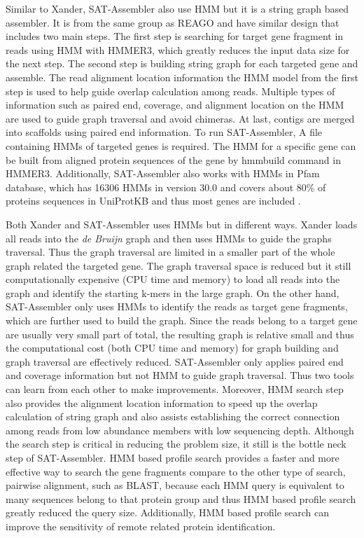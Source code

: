 \documentclass[]{msu-thesis}
\begin{document}
Similar to Xander, SAT-Assembler also use HMM but it is a string graph
based assembler. It is from the same group as REAGO and have similar
design that includes two main steps. The first step is searching for
target gene fragment in reads using HMM with HMMER3, which greatly
reduces the input data size for the next step. The second step is
building string graph for each targeted gene and assemble. The read
alignment location information the HMM model from the first step is
used to help guide overlap calculation among reads. Multiple types of
information such as paired end, coverage, and alignment location on
the HMM are used to guide graph traversal and avoid chimeras. At last,
contigs are merged into scaffolds using paired end information.  To
run SAT-Assembler, A file containing HMMs of targeted genes is
required. The HMM for a specific gene can be built from aligned
protein sequences of the gene by hmmbuild command in
HMMER3. Additionally, SAT-Assembler also works with HMMs in Pfam
database, which has 16306 HMMs in version 30.0 and covers about 80\%
of proteins sequences in UniProtKB and thus most genes are included
\cite{finn_pfam_2016}.

Both Xander and SAT-Assembler uses HMMs but in different ways. Xander
loads all reads into the \textit{de Bruijn} graph and then uses HMMs
to guide the graphs traversal. Thus the graph traversal are limited in
a smaller part of the whole graph related the targeted gene. The graph
traversal space is reduced but it still computationally expensive (CPU
time and memory) to load all reads into the graph and identify the
starting k-mers in the large graph.  On the other hand, SAT-Assembler
only uses HMMs to identify the reads as target gene fragments, which
are further used to build the graph. Since the reads belong to a
target gene are usually very small part of total, the resulting graph
is relative small and thus the computational cost (both CPU time and
memory) for graph building and graph traversal are effectively
reduced. SAT-Assembler only applies paired end and coverage
information but not HMM to guide graph traversal. Thus two tools can
learn from each other to make improvements.  Moreover, HMM search step
also provides the alignment location information to speed up the
overlap calculation of string graph and also assists establishing the
correct connection among reads from low abundance members with low
sequencing depth.  Although the search step is critical in reducing
the problem size, it still is the bottle neck step of
SAT-Assembler. HMM based profile search provides a faster and more
effective way to search the gene fragments compare to the other type
of search, pairwise alignment, such as BLAST, because each HMM query
is equivalent to many sequences belong to that protein group and thus
HMM based profile search greatly reduced the query size. Additionally,
HMM based profile search can improve the sensitivity of remote related
protein identification.
\end{document}
